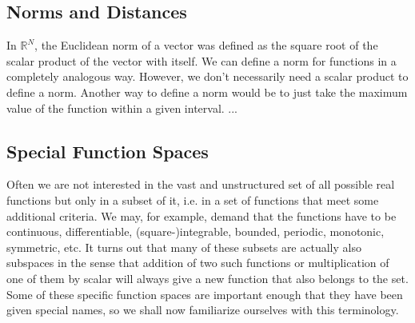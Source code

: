\subsection{Norms and Distances}
In $\mathbb{R}^N$, the Euclidean norm of a vector was defined as the square root of the scalar product of the vector with itself. We can define a norm for functions in a completely analogous way. However, we don't necessarily need a scalar product to define a norm. Another way to define a norm would be to just take the maximum value of the function within a given interval. ...

\subsection{Special Function Spaces}
Often we are not interested in the vast and unstructured set of all possible real functions but only in a subset of it, i.e. in a set of functions that meet some additional criteria. We may, for example, demand that the functions have to be continuous, differentiable, (square-)integrable, bounded, periodic, monotonic, symmetric, etc. It turns out that many of these subsets are actually also subspaces in the sense that addition of two such functions or multiplication of one of them by scalar will always give a new function that also belongs to the set. Some of these specific function spaces are important enough that they have been given special names, so we shall now familiarize ourselves with this terminology.

